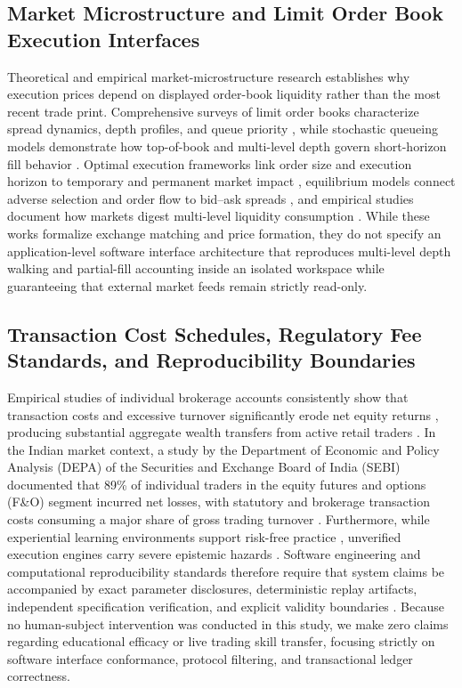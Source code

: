 \documentclass[journal,onecolumn,10pt]{IEEEtran}
\begin{document}
\subsection{Market Microstructure and Limit Order Book Execution Interfaces}
Theoretical and empirical market-microstructure research establishes why execution prices depend on displayed order-book liquidity rather than the most recent trade print. Comprehensive surveys of limit order books characterize spread dynamics, depth profiles, and queue priority \cite{gould2013}, while stochastic queueing models demonstrate how top-of-book and multi-level depth govern short-horizon fill behavior \cite{cont2010}. Optimal execution frameworks link order size and execution horizon to temporary and permanent market impact \cite{almgren2001}, equilibrium models connect adverse selection and order flow to bid--ask spreads \cite{kyle1985,glosten1985}, and empirical studies document how markets digest multi-level liquidity consumption \cite{bouchaud2009,hasbrouck2007,harris2003}. While these works formalize exchange matching and price formation, they do not specify an application-level software interface architecture that reproduces multi-level depth walking and partial-fill accounting inside an isolated workspace while guaranteeing that external market feeds remain strictly read-only.

\subsection{Transaction Cost Schedules, Regulatory Fee Standards, and Reproducibility Boundaries}
Empirical studies of individual brokerage accounts consistently show that transaction costs and excessive turnover significantly erode net equity returns \cite{barber2000,barber2002}, producing substantial aggregate wealth transfers from active retail traders \cite{barber2009}. In the Indian market context, a study by the Department of Economic and Policy Analysis (DEPA) of the Securities and Exchange Board of India (SEBI) documented that 89\% of individual traders in the equity futures and options (F\&O) segment incurred net losses, with statutory and brokerage transaction costs consuming a major share of gross trading turnover \cite{sebi2023}. Furthermore, while experiential learning environments support risk-free practice \cite{kolb1984}, unverified execution engines carry severe epistemic hazards \cite{bailey2014}. Software engineering and computational reproducibility standards therefore require that system claims be accompanied by exact parameter disclosures, deterministic replay artifacts, independent specification verification, and explicit validity boundaries \cite{peng2011,wohlin2012,parsa2025}. Because no human-subject intervention was conducted in this study, we make zero claims regarding educational efficacy or live trading skill transfer, focusing strictly on software interface conformance, protocol filtering, and transactional ledger correctness.
\end{document}

